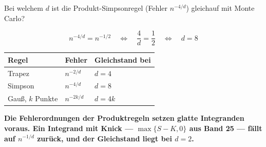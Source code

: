 \begin{aufgabe}
Bei welchem $d$ ist die Produkt-Simpsonregel (Fehler $n^{-4/d}$) gleichauf mit Monte Carlo?

\loesung
{}
\[ n^{-4/d} = n^{-1/2} \quad\Longleftrightarrow\quad \frac4d = \frac12 \quad\Longleftrightarrow\quad d = 8 \]

\begin{center}
{\small
\renewcommand{\arraystretch}{1.48}
\begin{tabular}{@{}P{3.0cm}P{2.0cm}P{2.6cm}@{}}
\toprule
\textbf{Regel} & \textbf{Fehler} & \textbf{Gleichstand bei}\\
\midrule
Trapez & $n^{-2/d}$ & $d = 4$\\
Simpson & $n^{-4/d}$ & $d = 8$\\
Gauß, $k$ Punkte & $n^{-2k/d}$ & $d = 4k$\\
\bottomrule
\end{tabular}}
\end{center}

\begin{center}
\begin{minipage}{0.9\textwidth}
\textbf{Die Fehlerordnungen der Produktregeln setzen glatte Integranden voraus. Ein Integrand mit Knick --- $\max\{S-K,0\}$ aus Band 25 --- fällt auf $n^{-1/d}$ zurück, und der Gleichstand liegt bei $d = 2$.}
\end{minipage}
\end{center}

\begin{center}
\begin{minipage}{0.88\textwidth}
\end{minipage}
\end{center}
\end{aufgabe}

